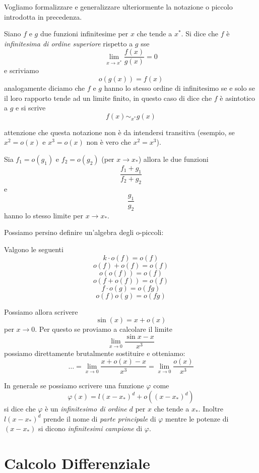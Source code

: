 \documentclass[11pt]{scrartcl}
\begin{document}
	Vogliamo formalizzare e generalizzare ulteriormente la notazione o piccolo introdotta in precedenza.
	\begin{definition}
		Siano $f$ e $g$ due funzioni infinitesime per $x$ che tende a $x^*$. Si dice che $f$ è \textit{infinitesima di ordine superiore} rispetto a $g$ sse 
		$$\lim_{x\to x^*}\frac{f(x)}{g(x)}=0$$
		e scriviamo
		$$o(g(x))=f(x)$$
		analogamente diciamo che $f$ e $g$ hanno lo stesso ordine di infinitesimo se e solo se il loro rapporto tende ad un limite finito, in questo caso di dice che $f$ è asintotico a $g$ e si scrive
		$$f(x)\sim_{x^*}g(x)$$
	\end{definition}
	attenzione che questa notazione non è da intendersi transitiva (esempio, se $x^2=o(x)$ e $x^3=o(x)$ non è vero che $x^2=x^3$).
	\begin{proposition}
		Sia $f_1=o(g_1)$ e $f_2=o(g_2)$ (per $x\to x_*$) allora le due funzioni 
		$$\frac{f_1+g_1}{f_2+g_2}$$
		e
		$$\frac{g_1}{g_2}$$
		hanno lo stesso limite per $x\to x_*$.
	\end{proposition}
	Possiamo persino definire un'algebra degli o-piccoli:
	\begin{proposition}
		Valgono le seguenti
		$$k\cdot o(f)=o(f)$$
		$$o(f)+o(f)=o(f)$$
		$$o(o(f))=o(f)$$
		$$o(f+o(f))=o(f)$$
		$$f\cdot o(g)=o(fg)$$
		$$o(f)o(g)=o(fg)$$
	\end{proposition}
	\begin{example}
		Possiamo allora scrivere
		$$\sin(x)=x+o(x)$$
		per $x\to 0$. Per questo se proviamo a calcolare il limite
		$$\lim_{x\to 0}\frac{\sin x - x}{x^3}$$
		possiamo direttamente brutalmente sostituire e otteniamo:
		$$\dots=\lim_{x\to 0}\frac{x+o(x)-x}{x^3}=\lim_{x\to 0}\frac{o(x)}{x^3}$$
	\end{example}
	\begin{definition}
		In generale se possiamo scrivere una funzione $\varphi$ come
		$$\varphi(x)=l(x-x_*)^d+o((x-x_*)^d)$$
		si dice che $\varphi$ è un \textit{infinitesimo di ordine} $d$ per $x$ che tende a $x_*$. Inoltre $l(x-x_*)^d$ prende il nome di \textit{parte principale} di $\varphi$ mentre le potenze di $(x-x_*)$ si dicono \textit{infinitesimi campione} di $\varphi$.
	\end{definition}
	
	
	\newpage
	
	\section{Calcolo Differenziale}
	
\end{document}
